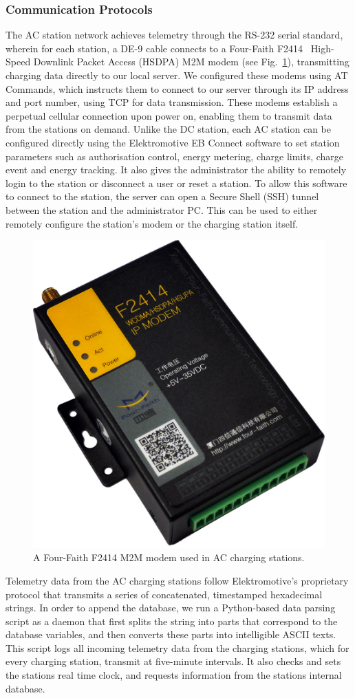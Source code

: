 \subsubsection{Communication Protocols}
The AC station network achieves telemetry through the RS-232 serial standard, wherein for each station, a DE-9 cable connects to a Four-Faith F2414~\cite{xiamen_four-faith_communication_technology_co._ltd._f2414_nodate} High-Speed Downlink Packet Access (HSDPA) M2M modem (see Fig.~\ref{fig:9:acmodem}), transmitting charging data directly to our local server. We configured these modems using AT Commands, which instructs them to connect to our server through its IP address and port number, using TCP for data transmission. These modems establish a perpetual cellular connection upon power on, enabling them to transmit data from the stations on demand. Unlike the DC station, each AC station can be configured directly using the Elektromotive EB Connect software to set station parameters such as authorisation control, energy metering, charge limits, charge event and energy tracking. It also gives the administrator the ability to remotely login to the station or disconnect a user or reset a station.  To allow this software to connect to the station, the server can open a Secure Shell (SSH) tunnel between the station and the administrator PC. This can be used to either remotely configure the station’s modem or the charging station itself. 


\begin{figure}[H]
	\centering
	\includegraphics[width=0.4\linewidth]{f2414-rs}
	\caption{A Four-Faith F2414 M2M modem used in AC charging stations.}
	\label{fig:9:acmodem}
\end{figure}

Telemetry data from the AC charging stations follow Elektromotive’s proprietary protocol that transmits a series of concatenated, timestamped hexadecimal strings. In order to append the database, we run a Python-based data parsing script as a daemon that first splits the string into parts that correspond to the database variables, and then converts these parts into intelligible ASCII texts. This script logs all incoming telemetry data from the charging stations, which for every charging station, transmit at five-minute intervals. It also checks and sets the stations real time clock, and requests information from the stations internal database. 

